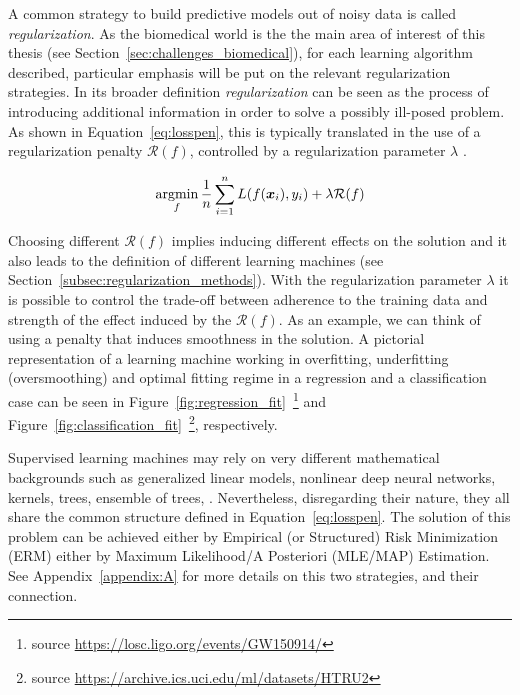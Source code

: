 	    A common strategy to build predictive models out of noisy data is called \textit{regularization}. As the biomedical world is the the main area of interest of this thesis (see Section~\ref{sec:challenges_biomedical}), for each learning algorithm described, particular emphasis will be put on the relevant regularization strategies.
	    In its broader definition \textit{regularization} can be seen as the process of introducing additional information in order to solve a possibly ill-posed problem.
			As shown in Equation~\eqref{eq:losspen}, this is typically translated in the use of a regularization penalty $\mathcal{R}(f)$, controlled by a regularization parameter $\lambda$ \cite{tikhonov1963solution, evgeniou2000regularization}.

	     \begin{equation}\label{eq:losspen}
	    	\mathop{\mathrm{argmin}}\limits_f \frac{1}{n}\sum_{i=1}^n L(f(\bm{x}_i),y_i) + \lambda \mathcal{R}(f)
	    \end{equation}

			Choosing different $\mathcal{R}(f)$ implies inducing different effects on the solution and it also leads to the definition of different learning machines (see Section~\ref{subsec:regularization_methods}).
			With the regularization parameter $\lambda$ it is possible to control the trade-off between adherence to the training data and strength of the effect induced by the $\mathcal{R}(f)$.
			As an example, we can think of using a penalty that induces smoothness in the solution.
			A pictorial representation of a learning machine working in overfitting, underfitting (\aka oversmoothing) and optimal fitting regime in a regression and a classification case can be seen in
			Figure~\ref{fig:regression_fit}~\footnote{source \url{https://losc.ligo.org/events/GW150914/}}
			and
		  Figure~\ref{fig:classification_fit}~\footnote{source \url{https://archive.ics.uci.edu/ml/datasets/HTRU2}}, respectively.



	    Supervised learning machines may rely on very different mathematical backgrounds such as generalized linear models, nonlinear deep neural networks, kernels, trees, ensemble of trees, \etc. Nevertheless, disregarding their nature, they all share the common structure defined in Equation~\eqref{eq:losspen}.
	    The solution of this problem can be achieved either by Empirical (or Structured) Risk Minimization (\ac{ERM}) either by Maximum Likelihood/A Posteriori (\ac{MLE}/\ac{MAP}) Estimation. See Appendix~\ref{appendix:A} for more details on this two strategies, and their connection.

